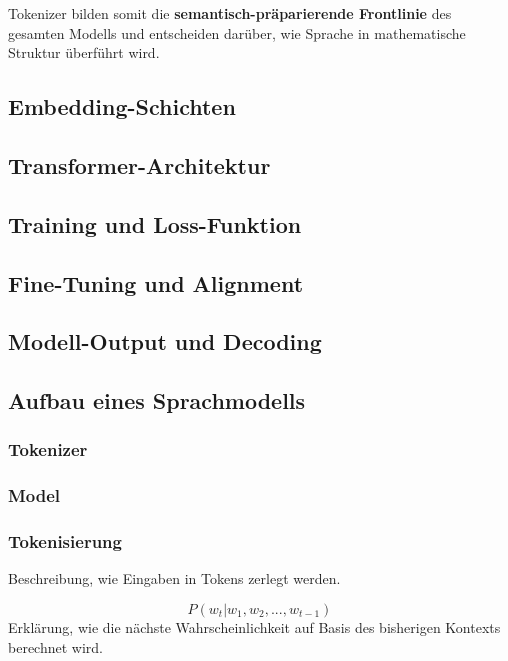 Tokenizer bilden somit die \textbf{semantisch-präparierende Frontlinie} des gesamten Modells und entscheiden darüber, wie Sprache in mathematische Struktur überführt wird.

\subsection{Embedding-Schichten}
\subsection{Transformer-Architektur}
\subsection{Training und Loss-Funktion}
\subsection{Fine-Tuning und Alignment}
\subsection{Modell-Output und Decoding}


\subsection{Aufbau eines Sprachmodells}
\subsubsection{Tokenizer}
\subsubsection{Model}

\subsubsection{Tokenisierung}
Beschreibung, wie Eingaben in Tokens zerlegt werden.

\[
P(w_t | w_1, w_2, ..., w_{t-1})
\]
Erklärung, wie die nächste Wahrscheinlichkeit auf Basis des bisherigen Kontexts berechnet wird.

